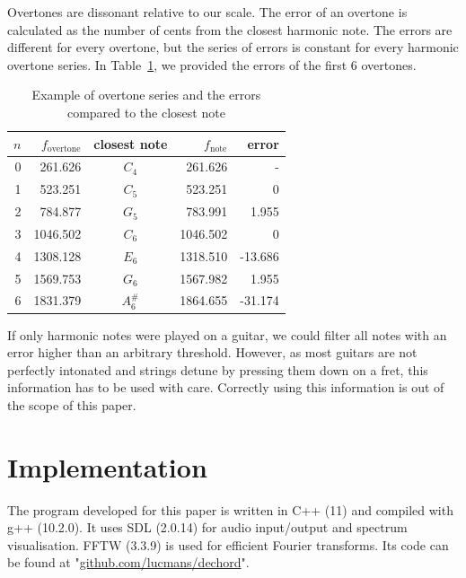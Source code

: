 \documentclass[10pt,twocolumn]{article}
\begin{document}
Overtones are dissonant relative to our scale. The error of an overtone is calculated as the number of cents from the closest harmonic note. The errors are different for every overtone, but the series of errors is constant for every harmonic overtone series. In Table~\ref{tab:overseries}, we provided the errors of the first 6 overtones.
\begin{table}[H]\vspace{-3mm}
    \centering
    \begin{tabular}{rrcrr}
        $n$ & $f_{\text{overtone}}$ & closest note & $f_\text{note}$ & error \\
        \hline
        0 & 261.626  & $C_4$    & 261.626  &  - \\
        1 & 523.251  & $C_5$    & 523.251  &  0 \\
        2 & 784.877  & $G_5$    & 783.991  &  1.955 \\
        3 & 1046.502 & $C_6$    & 1046.502 &  0 \\
        4 & 1308.128 & $E_6$    & 1318.510 &  -13.686 \\
        5 & 1569.753 & $G_6$    & 1567.982 &  1.955 \\
        6 & 1831.379 & $A^\#_6$ & 1864.655 &  -31.174 \\
    \end{tabular}
    \caption{Example of overtone series and the errors compared to the closest note}
    \label{tab:overseries}
\end{table}\vspace{-3mm}
If only harmonic notes were played on a guitar, we could filter all notes with an error higher than an arbitrary threshold. However, as most guitars are not perfectly intonated and strings detune by pressing them down on a fret, this information has to be used with care. Correctly using this information is out of the scope of this paper.


\section{Implementation}  \label{sec:impl}
The program developed for this paper is written in C++ (11) and compiled with g++ (10.2.0). It uses SDL (2.0.14) for audio input/output and spectrum visualisation. FFTW (3.3.9) is used for efficient Fourier transforms. Its code can be found at "\url{github.com/lucmans/dechord}".
%
\end{document}
